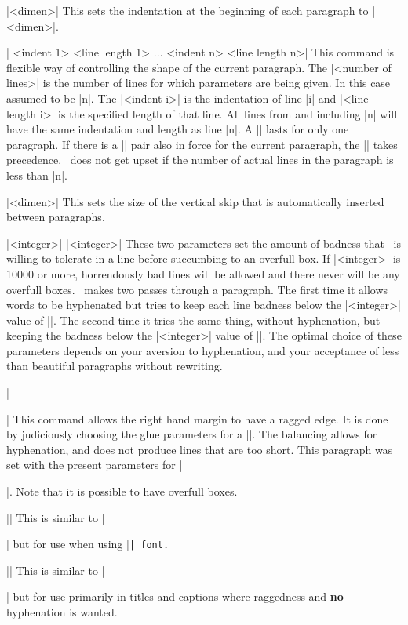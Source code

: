 \mbr
\pri\@|\parindent [=] <dimen>|
\nbr
This sets the indentation at the  beginning of each paragraph to
|<dimen>|.

\mbr
\pri\@| <indent 1> <line length 1>
       ... <indent n> <line length n>|
\nbr
This command is flexible way of controlling the shape of the current
paragraph. The |<number of lines>| is the number of lines for which
parameters are being given. In this case assumed to be |n|. The 
|<indent i>| is the indentation of line |i| and |<line length i>| is the
specified length of that line. All lines from  and including |n| will have
the same indentation and length as line |n|. A |\parshape| lasts for only one
paragraph. If there is a |\hangindent \hangafter| pair also in force for the
current paragraph, the |\parshape| takes precedence. \tex\ does not get upset
if the number of actual lines in the paragraph is less than |n|.


\mbr
\pri\@|\parskip [=] <dimen>|
\nbr
This sets the size of the vertical skip that is automatically inserted
between paragraphs.
 

\mbr
\pri\@|\pretolerance [=] <integer>|
\nbr
\pri\@|\tolerance [=] <integer>|
\nbr
These two parameters set the amount of badness that \tex\ is willing to
tolerate in a line before succumbing to an overfull box. If |<integer>| is
10000 or more, horrendously bad lines will be allowed and there never will be any
overfull boxes. \tex\ makes two passes through a paragraph. The first time it
allows words to be hyphenated but tries to keep each line badness below the
|<integer>| value of |\pretolerance|. The second time it tries the same
thing, without hyphenation, but keeping the badness below the |<integer>|
value of |\tolerance|. The optimal choice of these parameters depends on your
aversion to hyphenation, and your acceptance of less than beautiful
paragraphs without rewriting.

\begingroup \raggedright \overfullrule=5pt
\mbr
\pla\@|\raggedright|
\nbr
This command allows the right hand margin to have a ragged edge. It is
done by judiciously choosing the glue parameters for a |\rightskip|. The
balancing allows for hyphenation, and does not produce lines that are too
short. This paragraph was set with the present parameters for |\raggedright|.
Note that it is possible to have overfull boxes.
\endgroup

\mbr
\pla\@|\ttraggedright|
\nbr
This is similar to |\raggedright| but for use when using |\tt| font.

\mbr
\pla\@|\veryraggedright|
\nbr
This is similar to |\raggedright| but for use primarily in titles and
captions where raggedness and {\bf no} hyphenation is wanted.

\endblockmode
\ejectpage
\done